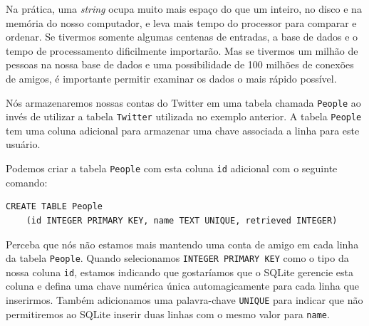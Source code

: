 Na prática, uma {\it string} ocupa muito mais espaço do que um inteiro, no
disco e na memória do nosso computador, e leva mais tempo do processor para
comparar e ordenar. Se tivermos somente algumas centenas de entradas, a base
de dados e o tempo de processamento dificilmente importarão. Mas se tivermos
um milhão de pessoas na nossa base de dados e uma possibilidade de 100 milhões
de conexões de amigos, é importante permitir examinar os dados o mais rápido
possível.


Nós armazenaremos nossas contas do Twitter em uma tabela chamada {\tt People}
ao invés de utilizar a tabela {\tt Twitter} utilizada no exemplo anterior. A
tabela {\tt People} tem uma coluna adicional para armazenar uma chave associada
a linha para este usuário.


Podemos criar a tabela {\tt People} com esta coluna {\tt id} adicional com o
seguinte comando:

\beforeverb
\begin{verbatim}
CREATE TABLE People 
    (id INTEGER PRIMARY KEY, name TEXT UNIQUE, retrieved INTEGER)
\end{verbatim}
\afterverb
%
%
Perceba que nós não estamos mais mantendo uma conta de amigo em cada linha da
tabela {\tt People}. Quando selecionamos {\tt INTEGER PRIMARY KEY} como o tipo
da nossa coluna {\tt id}, estamos indicando que gostaríamos que o SQLite
gerencie esta coluna e defina uma chave numérica única automagicamente para
cada linha que inserirmos. Também adicionamos uma palavra-chave {\tt UNIQUE}
para indicar que não permitiremos ao SQLite inserir duas linhas com o mesmo
valor para {\tt name}.

